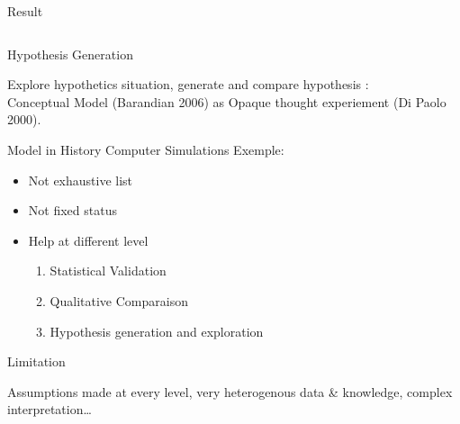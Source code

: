 \documentclass[12pt, notes=show]{beamer}
\begin{document}
\begin{frame}{Result}
\begin{tabular}{m{5cm}m{5cm}}
    \end{tabular}

\end{frame}

\begin{frame}{Hypothesis Generation}
    
    Explore hypothetics situation, generate and compare hypothesis :\\
    \vfill
    \hspace{.5cm}Conceptual Model (Barandian 2006) as Opaque thought experiement (Di Paolo 2000).
    \vfill

\end{frame}

\begin{frame}{Model in History}
    Computer Simulations Exemple:
    \begin{itemize}
	\item Not exhaustive list
	\item Not fixed status
	\item Help at different level
	    \begin{enumerate}
		\item Statistical Validation
		\item Qualitative Comparaison
		\item Hypothesis generation and exploration
	    \end{enumerate}

    \end{itemize}
    

\end{frame}

\begin{frame}{Limitation}
    \begin{center}
	Assumptions made at every level, very heterogenous data \& knowledge, complex interpretation\dots
    \end{center}
\end{frame}
\end{document}
